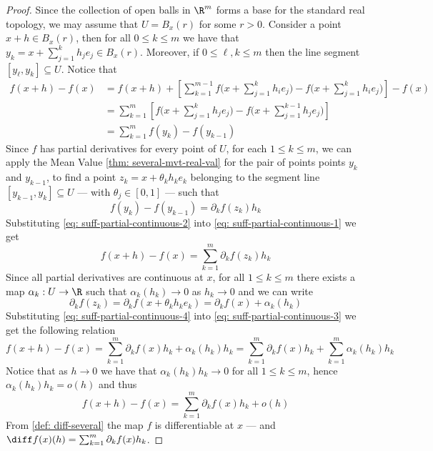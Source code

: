 \begin{proof}
  Since the collection of open balls in \(\R^m\) forms a base for the standard
  real topology, we may assume that \(U = B_x(r)\) for some \(r > 0\). Consider
  a point \(x + h \in B_x(r)\), then for all \(0 \leq k \leq m\) we have that
  \(y_k = x + \sum_{j=1}^k h_j e_j \in B_x(r)\). Moreover, if \(0 \leq \ell, k
  \leq m\) then the line segment \([y_\ell, y_k] \subseteq U\). Notice that
  \begin{align}\label{eq: suff-partial-continuous-1}
    \nonumber
    f(x + h) - f(x)
    &= f(x + h) + \left[ \sum_{k=1}^{m-1}
      f\bigg( x + \sum_{j=1}^k h_i e_j \bigg) -
      f\bigg( x + \sum_{j=1}^k h_i e_j \bigg)
    \right] - f(x)
    \\
    \nonumber
    &= \sum_{k=1}^m \left[
      f\bigg( x + \sum_{j=1}^k h_j e_j \bigg)
      - f\bigg( x + \sum_{j=1}^{k-1} h_j e_j \bigg)
    \right]
    \\
    &= \sum_{k=1}^m f(y_k) - f(y_{k-1})
  \end{align}
  Since \(f\) has partial derivatives for every point of \(U\), for each \(1
  \leq k \leq m\), we can apply the Mean Value \cref{thm: several-mvt-real-val}
  for the pair of points points \(y_k\) and \(y_{k-1}\), to find a point \(z_k =
  x + \theta_k h_k e_k\) belonging to the segment line \([y_{k-1}, y_k]
  \subseteq U\) --- with \(\theta_j \in [0, 1]\) --- such that
  \begin{equation}\label{eq: suff-partial-continuous-2}
    f(y_k) - f(y_{k-1}) = \partial_k f(z_k) h_k
  \end{equation}
  Substituting \cref{eq: suff-partial-continuous-2} into \cref{eq:
  suff-partial-continuous-1} we get
  \begin{equation}\label{eq: suff-partial-continuous-3}
    f(x + h) - f(x)
    = \sum_{k=1}^m \partial_k f(z_k) h_k
  \end{equation}
  Since all partial derivatives are continuous at \(x\), for all \(1 \leq k \leq
  m\) there exists a map \(\alpha_k: U \to \R\) such that \(\alpha_k(h_k) \to
  0\) as \(h_k \to 0\) and we can write
  \begin{equation}\label{eq: suff-partial-continuous-4}
     \partial_k f(z_k) = \partial_k f(x + \theta_k h_k e_k)
     = \partial_k f(x) + \alpha_k(h_k)
  \end{equation}
  Substituting \cref{eq: suff-partial-continuous-4} into \cref{eq:
  suff-partial-continuous-3} we get the following relation
  \[
    f(x + h) - f(x) = \sum_{k=1}^m \partial_k f(x) h_k + \alpha_k(h_k) h_k
    = \sum_{k=1}^m \partial_k f(x) h_k + \sum_{k=1}^m \alpha_k(h_k) h_k
  \]
  Notice that as \(h \to 0\) we have that \(\alpha_k(h_k) h_k \to 0\) for all
  \(1 \leq k \leq m\), hence \(\alpha_k(h_k) h_k = o(h)\) and thus
  \[
    f(x + h) - f(x) = \sum_{k=1}^m \partial_k f(x) h_k + o(h)
  \]
  From \cref{def: diff-several} the map \(f\) is differentiable at \(x\) --- and
  \(\diff f(x)(h) = \sum_{k=1}^m \partial_k f(x) h_k\).
\end{proof}

